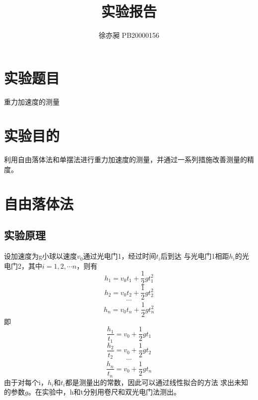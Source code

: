 \documentclass[UTF8]{ctexart}
\begin{document}
\title{实验报告}  
\author{徐亦昶 PB20000156}
\maketitle
\section{实验题目}重力加速度的测量
\section{实验目的}利用自由落体法和单摆法进行重力加速度的测量，并通过一系列措施改善测量的精度。
\section{自由落体法}
\subsection*{实验原理}
设加速度为g小球以速度$v_0$通过光电门1，经过时间$t_i$后到达
与光电门1相距$h_i$的光电门2，其中$i=1,2,\cdots n$，则有
\[h_1=v_0t_1+\frac{1}{2}gt_1^2\]
\[h_2=v_0t_2+\frac{1}{2}gt_2^2\]
\[\cdots\]
\[h_n=v_0t_n+\frac{1}{2}gt_n^2\]
即
\[\frac{h_1}{t_1}=v_0+\frac{1}{2}gt_1\]
\[\frac{h_2}{t_2}=v_0+\frac{1}{2}gt_2\]
\[\cdots\]
\[\frac{h_n}{t_n}=v_0+\frac{1}{2}gt_n\]
由于对每个i，$h_i$和$t_i$都是测量出的常数，因此可以通过线性拟合的方法
求出未知的参数$g$。在实验中，h和t分别用卷尺和双光电门法测出。
\end{document}
